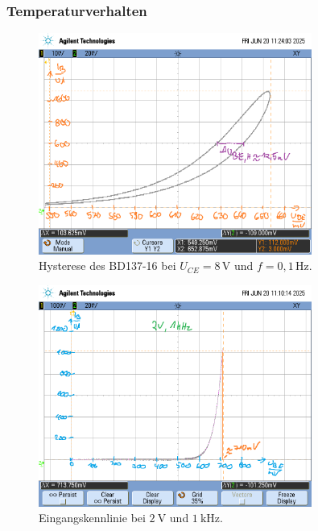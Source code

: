 \documentclass[
	a4paper, %
	12pt, %
]{CSUniSchoolLabReport}
\begin{document}
\subsubsection{Temperaturverhalten}
\begin{figure}[H]
	\centering
	\includegraphics[width=0.8\textwidth]{Figures/TemperaturHysterese8V0.1hznah.png}
	\caption{Hysterese des BD137-16 bei $U_{CE} = 8\,\mathrm{V}$ und $f = 0{,}1\,\mathrm{Hz}$.}
	\label{fig:8VTemperaturHysterese0.1hznah}
\end{figure}
\begin{figure}[H]
	\centering
	\includegraphics[width=0.8\textwidth]{Figures/temp2v1khz.png}
	\caption{Eingangskennlinie bei $\SI{2}{\volt}$ und $\SI{1}{\kilo\hertz}$.}
	\label{fig:2V1eingang}
\end{figure}
\end{document}
